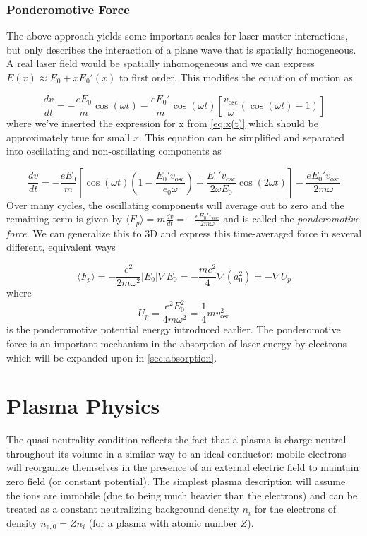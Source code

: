 \subsubsection{Ponderomotive Force}
The above approach yields some important scales for laser-matter interactions, but only describes the interaction of a plane wave that is spatially homogeneous. A real laser field would be spatially inhomogeneous and we can express $E(x) \approx E_0 + x E_0'(x)$ to first order. This modifies the equation of motion as 

\begin{equation}
	\frac{d v}{d t} = - \frac{e E_0}{m} \cos(\omega t) - \frac{e E_0'}{m} \cos(\omega t)[ \frac{v_\text{osc}}{\omega}(\cos(\omega t) - 1)]
\end{equation}
where we've inserted the expression for x from \cref{eq:x(t)} which should be approximately true for small $x$. This equation can be simplified and separated into oscillating and non-oscillating components as

\begin{equation}
	\frac{d v}{d t} = - \frac{e E_0}{m} [\cos(\omega t)(1 - \frac{E_0' v_\text{osc}}{e_0 \omega}) + \frac{E_0' v_\text{osc}}{2 \omega E_0} \cos(2 \omega t)] - \frac{e E_0' v_\text{osc}}{2 m \omega}
\end{equation}
Over many cycles, the oscillating components will average out to zero and the remaining term is given by $\langle F_p \rangle = m \frac{d v}{d t} = - \frac{e E_0' v_\text{osc}}{2 m \omega}$ and is called the \emph{ponderomotive force}. We can generalize this to 3D and express this time-averaged force in several different, equivalent ways

\begin{equation}
	\langle F_p \rangle = - \frac{e^2}{2 m \omega^2} \lvert E_0 \rvert \nabla E_0 = - \frac{m c^2}{4} \nabla(a_0^2) = - \nabla U_p \label{eq:pond_force}
\end{equation}
where 
\begin{equation}
	U_p = \frac{e^2 E_0^2}{4 m \omega^2} = \frac{1}{4} m v_\text{osc}^2 \label{eq:pond_potential}
\end{equation}
is the ponderomotive potential energy introduced earlier. The ponderomotive force is an important mechanism in the absorption of laser energy by electrons which will be expanded upon in \cref{sec:absorption}.

\section{Plasma Physics}
The quasi-neutrality condition reflects the fact that a plasma is charge neutral throughout its volume in a similar way to an ideal conductor: mobile electrons will reorganize themselves in the presence of an external electric field to maintain zero field (or constant  potential). The simplest plasma description will assume the ions are immobile (due to being much heavier than the electrons) and can be treated as a constant neutralizing background density $n_i$ for the electrons of density $n_{e,0} = Z n_i$ (for a plasma with atomic number $Z$).

